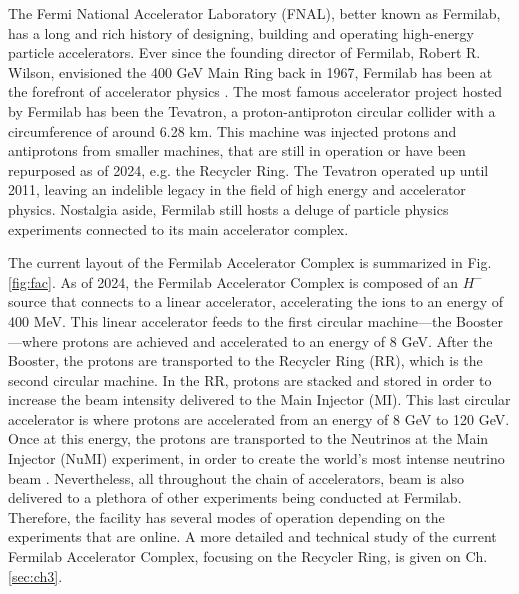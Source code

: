 The Fermi National Accelerator Laboratory (FNAL), better known as Fermilab, has a long and rich history of designing, building and operating high-energy particle accelerators. Ever since the founding director of Fermilab, Robert R. Wilson, envisioned the 400 GeV Main Ring back in 1967, Fermilab has been at the forefront of accelerator physics \cite{fermilab1,fermi50,tevatron}. The most famous accelerator project hosted by Fermilab has been the Tevatron, a proton-antiproton circular collider with a circumference of around 6.28 km. This machine was injected protons and antiprotons from smaller machines, that are still in operation or have been repurposed as of 2024, e.g. the Recycler Ring. The Tevatron operated up until 2011, leaving an indelible legacy in the field of high energy and accelerator physics. Nostalgia aside, Fermilab still hosts a deluge of particle physics experiments connected to its main accelerator complex.      

The current layout of the Fermilab Accelerator Complex is summarized in Fig. \ref{fig:fac}. As of 2024, the Fermilab Accelerator Complex is composed of an $H^-$ source that connects to a linear accelerator, accelerating the ions to an energy of 400 MeV. This linear accelerator feeds to the first circular machine---the Booster---where protons are achieved and accelerated to an energy of 8 GeV. After the Booster, the protons are transported to the Recycler Ring (RR), which is the second circular machine. In the RR, protons are stacked and stored in order to increase the beam intensity delivered to the Main Injector (MI). This last circular accelerator is where protons are accelerated from an energy of 8 GeV to 120 GeV. Once at this energy, the protons are transported to the Neutrinos at the Main Injector (NuMI) experiment, in order to create the world's most intense neutrino beam \cite{numi1}. Nevertheless, all throughout the chain of accelerators, beam is also delivered to a plethora of other experiments being conducted at Fermilab. Therefore, the facility has several modes of operation depending on the experiments that are online. A more detailed and technical study of the current Fermilab Accelerator Complex, focusing on the Recycler Ring, is given on Ch. \ref{sec:ch3}.   

